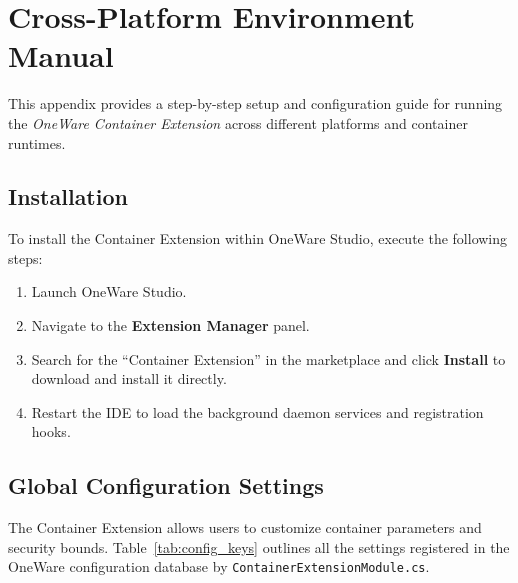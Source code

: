 
\chapter{Cross-Platform Environment Manual}
\label{app:manual}

This appendix provides a step-by-step setup and configuration guide for running the \textit{OneWare Container Extension} across different platforms and container runtimes.

\section{Installation}
To install the Container Extension within OneWare Studio, execute the following steps:
\begin{enumerate}
    \item Launch OneWare Studio.
    \item Navigate to the \textbf{Extension Manager} panel.
    \item Search for the ``Container Extension'' in the marketplace and click \textbf{Install} to download and install it directly.
    \item Restart the IDE to load the background daemon services and registration hooks.
\end{enumerate}

\section{Global Configuration Settings}
The Container Extension allows users to customize container parameters and security bounds. Table~\ref{tab:config_keys} outlines all the settings registered in the OneWare configuration database by \texttt{ContainerExtensionModule.cs}.

